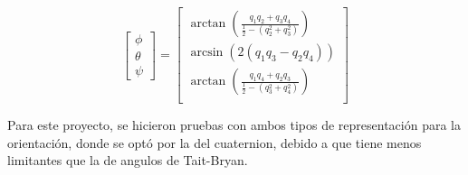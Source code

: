     \begin{equation}
        \begin{bmatrix}
            \phi \\ \theta \\ \psi 
        \end{bmatrix} =
            \begin{bmatrix}
                \arctan \left (\frac{q_1q_2 + q_3q_4}{\frac{1}{2}-(q^2_2+q^2_3)} \right ) \\
                \arcsin  (2(q_1q_3-q_2q_4)) \\
                \arctan \left (\frac{q_1q_4 + q_2q_3}{\frac{1}{2}-(q^2_3+q^2_4)} \right ) \\
            \end{bmatrix}
    \end{equation}

    Para este proyecto, se hicieron pruebas con ambos tipos de representación para la orientación, 
    donde se optó por la del cuaternion, debido a que tiene menos limitantes que la de angulos de Tait-Bryan.

